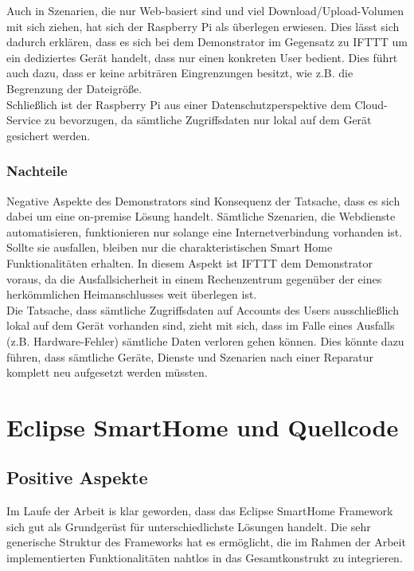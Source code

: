 Auch in Szenarien, die nur Web-basiert sind und viel Download/Upload-Volumen mit sich ziehen, hat sich der Raspberry Pi als überlegen erwiesen. Dies lässt sich dadurch erklären, dass es sich bei dem Demonstrator im Gegensatz zu IFTTT um ein dediziertes Gerät handelt, dass nur einen konkreten User bedient. Dies führt auch dazu, dass er keine arbiträren Eingrenzungen besitzt, wie z.B. die Begrenzung der Dateigröße.\\


Schließlich ist der Raspberry Pi aus einer Datenschutzperspektive dem Cloud-Service zu bevorzugen, da sämtliche Zugriffsdaten nur lokal auf dem Gerät gesichert werden.

\subsubsection{Nachteile}
Negative Aspekte des Demonstrators sind Konsequenz der Tatsache, dass es sich dabei um eine on-premise Lösung handelt. Sämtliche Szenarien, die Webdienste automatisieren, funktionieren nur solange eine Internetverbindung  vorhanden ist. Sollte sie ausfallen, bleiben nur die charakteristischen Smart Home Funktionalitäten erhalten. In diesem Aspekt ist IFTTT dem Demonstrator voraus, da die Ausfallsicherheit in einem Rechenzentrum gegenüber der eines herkömmlichen Heimanschlusses weit überlegen ist.\\

Die Tatsache, dass sämtliche Zugriffsdaten auf Accounts des Users ausschließlich lokal auf dem Gerät vorhanden sind, zieht mit sich, dass im Falle eines Ausfalls (z.B. Hardware-Fehler) sämtliche Daten verloren gehen können. Dies könnte dazu führen, dass sämtliche Geräte, Dienste und Szenarien nach einer Reparatur komplett neu aufgesetzt werden müssten.



\section{Eclipse SmartHome und Quellcode}
\subsection{Positive Aspekte}
Im Laufe der Arbeit is klar geworden, dass das Eclipse SmartHome Framework sich gut als Grundgerüst für unterschiedlichste Lösungen handelt. Die sehr generische Struktur des Frameworks hat es ermöglicht, die im Rahmen der Arbeit implementierten Funktionalitäten nahtlos in das Gesamtkonstrukt zu integrieren. 

